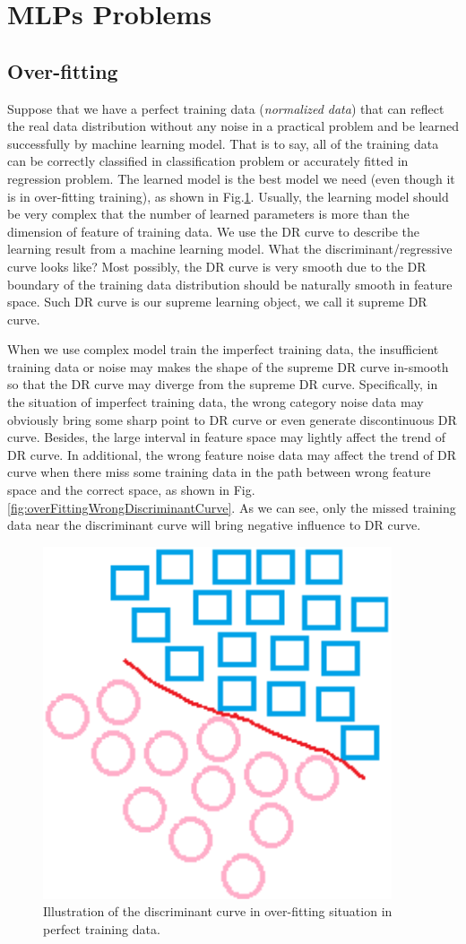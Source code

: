\documentclass[runningheads,openany]{xhlPaper}
\begin{document}
\section{MLPs Problems}

\subsection{Over-fitting}
\label{sec:overFittingInDR}
Suppose that we have a perfect training data (\emph{normalized data}) that can reflect the real data distribution without any noise in a practical problem and be learned successfully by machine learning model. That is to say, all of the training data can be correctly classified in classification problem or accurately fitted in regression problem. The learned model is the best model we need (even though it is in over-fitting training), as shown in Fig.\ref{fig:overFittingOnPerfectData}. Usually, the learning model should be very complex that the number of learned parameters is more than the dimension of feature of training data. We use the DR curve to describe the learning result from a machine learning model. What the discriminant/regressive curve looks like? Most possibly, the DR curve is very smooth due to the DR boundary of the training data distribution should be naturally smooth in feature space. Such DR curve is our supreme learning object, we call it supreme DR curve.

When we use complex model train the imperfect training data, the insufficient training data or noise may makes the shape of the supreme DR curve in-smooth so that the DR curve may diverge from the supreme DR curve.
Specifically, in the situation of imperfect training data, the wrong category noise data may obviously bring some sharp point to DR curve or even generate discontinuous DR curve. Besides, the large interval in feature space may lightly affect the trend of DR curve. In additional, the wrong feature noise data may affect the trend of DR curve when there miss some training data in the path between wrong feature space and the correct space, as shown in Fig.\ref{fig:overFittingWrongDiscriminantCurve}. As we can see, only the missed training data near the discriminant curve will bring negative influence to DR curve.

\begin{figure}
\centering
\includegraphics[width=0.35\linewidth]{overFittingOnPerfectData}
\caption{Illustration of the discriminant curve in over-fitting situation in perfect training data.}
\label{fig:overFittingOnPerfectData}
\end{figure}
\end{document}
